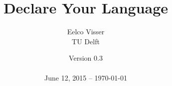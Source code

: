 \newcommand{\Version}{0.3}

\title{Declare Your Language}
	
\author{Eelco Visser\\[20pt]TU Delft\\[20pt]}
	
\date{Version \Version \\\ \\June 12, 2015 -- \today}
	



%



%
%
%



	

